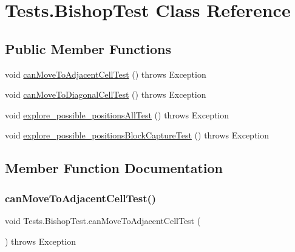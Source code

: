 \hypertarget{class_tests_1_1_bishop_test}{}\section{Tests.\+Bishop\+Test Class Reference}
\label{class_tests_1_1_bishop_test}
\subsection*{Public Member Functions}
\begin{DoxyCompactItemize}
\item 
void \hyperlink{class_tests_1_1_bishop_test_af8320bc069c8e9f0d2463a046161a174}{can\+Move\+To\+Adjacent\+Cell\+Test} ()  throws Exception 
\item 
void \hyperlink{class_tests_1_1_bishop_test_ad994f25fbfd9195cfb06b0dfac9c4958}{can\+Move\+To\+Diagonal\+Cell\+Test} ()  throws Exception 
\item 
void \hyperlink{class_tests_1_1_bishop_test_a39c7fec14bfa1fe60b4a669d3f52d6b3}{explore\+\_\+possible\+\_\+positions\+All\+Test} ()  throws Exception 
\item 
void \hyperlink{class_tests_1_1_bishop_test_a3da32d2c9bd46cef51386f999bb02e64}{explore\+\_\+possible\+\_\+positions\+Block\+Capture\+Test} ()  throws Exception 
\end{DoxyCompactItemize}


\subsection{Member Function Documentation}
\mbox{\label{class_tests_1_1_bishop_test_af8320bc069c8e9f0d2463a046161a174}} 
\subsubsection{\texorpdfstring{can\+Move\+To\+Adjacent\+Cell\+Test()}{canMoveToAdjacentCellTest()}}
{\footnotesize\ttfamily void Tests.\+Bishop\+Test.\+can\+Move\+To\+Adjacent\+Cell\+Test (\begin{DoxyParamCaption}{ }\end{DoxyParamCaption}) throws Exception\hspace{0.3cm}{\ttfamily [inline]}}

